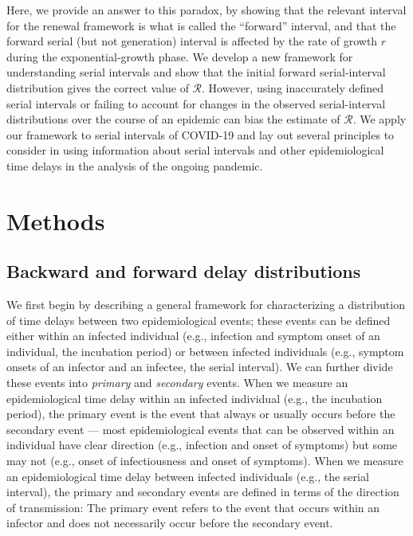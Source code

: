 \documentclass[12pt]{article}
\newcommand{\comment}{\showcomment}
\newcommand{\showcomment}[3]{\textcolor{#1}{\textbf{[#2: }\textsl{#3}\textbf{]}}}
\newcommand{\jd}[1]{\comment{cyan}{JD}{#1}}
\newcommand{\swp}[1]{\comment{magenta}{SWP}{#1}}
\newcommand{\RR}{\ensuremath{{\mathcal R}}\xspace}
\begin{document}
Here, we provide an answer to this paradox, by showing that the relevant interval for the renewal framework is what is called the ``forward'' interval, and that the forward serial (but not generation) interval is affected by the rate of growth $r$ during the exponential-growth phase.
We develop a new framework for understanding serial intervals and show that the initial forward serial-interval distribution gives the correct value of \RR.
However, using inaccurately defined serial intervals or failing to account for changes in the observed serial-interval distributions over the course of an epidemic can bias the estimate of \RR.
We apply our framework to serial intervals of COVID-19 and lay out several principles to consider in using information about serial intervals and other epidemiological time delays in the analysis of the ongoing pandemic.

\section{Methods}

\subsection{Backward and forward delay distributions}

We first begin by describing a general framework for characterizing a distribution of time delays between two epidemiological events;
these events can be defined either within an infected individual (e.g., infection and symptom onset of an individual, the incubation period) or between infected individuals (e.g., symptom onsets of an infector and an infectee, the serial interval).
We can further divide these events into \emph{primary} and \emph{secondary} events.
When we measure an epidemiological time delay within an infected individual (e.g., the incubation period), the primary event is the event that always or usually occurs before the secondary event ---
most epidemiological events that can be observed within an individual have clear direction (e.g., infection and onset of symptoms) but some may not (e.g., onset of infectiousness and onset of symptoms).
When we measure an epidemiological time delay between infected individuals (e.g., the serial interval), 
the primary and secondary events are defined in terms of the direction of transmission:
The primary event refers to the event that occurs within an infector and does not necessarily occur before the secondary event.
\end{document}
